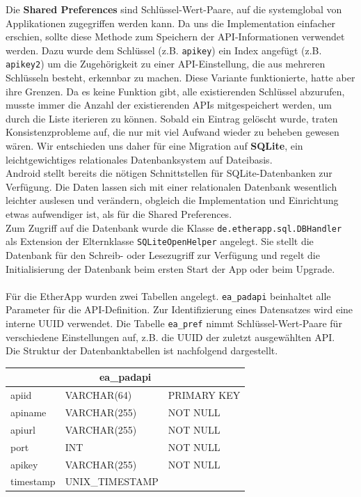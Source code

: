 Die \textbf{Shared Preferences} sind Schlüssel-Wert-Paare, auf die systemglobal von Applikationen zugegriffen werden kann.
Da uns die Implementation einfacher erschien, sollte diese Methode zum Speichern der API-Informationen verwendet werden.
Dazu wurde dem Schlüssel (z.B. \texttt{apikey}) ein Index angefügt (z.B. \texttt{apikey2}) um die Zugehörigkeit zu einer API-Einstellung, die aus mehreren Schlüsseln besteht, erkennbar zu machen.
Diese Variante funktionierte, hatte aber ihre Grenzen.
Da es keine Funktion gibt, alle existierenden Schlüssel abzurufen, musste immer die Anzahl der existierenden APIs mitgespeichert werden, um durch die Liste iterieren zu können.
Sobald ein Eintrag gelöscht wurde, traten Konsistenzprobleme auf, die nur mit viel Aufwand wieder zu beheben gewesen wären.
Wir entschieden uns daher für eine Migration auf \textbf{SQLite}, ein leichtgewichtiges relationales Datenbanksystem auf Dateibasis.\\
Android stellt bereits  die nötigen Schnittstellen für SQLite-Datenbanken zur Verfügung.
Die Daten lassen sich mit einer relationalen Datenbank wesentlich leichter auslesen und verändern, obgleich die Implementation und Einrichtung etwas aufwendiger ist, als für die Shared Preferences.\\
Zum Zugriff auf die Datenbank wurde die Klasse \texttt{de.etherapp.sql.DBHandler} als Extension der Elternklasse \texttt{SQLiteOpenHelper} angelegt.
Sie stellt die Datenbank für den Schreib- oder Lesezugriff zur Verfügung und regelt die Initialisierung der Datenbank beim ersten Start der App oder beim Upgrade.\\
\\
Für die EtherApp wurden zwei Tabellen angelegt.
\texttt{ea\_padapi} beinhaltet alle Parameter für die API-Definition.
Zur Identifizierung eines Datensatzes wird eine interne UUID verwendet.
Die Tabelle \texttt{ea\_pref} nimmt Schlüssel-Wert-Paare für verschiedene Einstellungen auf, z.B. die UUID der zuletzt ausgewählten API.\\
Die Struktur der Datenbanktabellen ist nachfolgend dargestellt.

\begin{table}[h!]
	\begin{center}
		\footnotesize
		\begin{tabular}{|p{2.5cm}|p{3.5cm}|p{3cm}|}
			\hline
			\multicolumn{3}{|c|}{\textbf{ea\_padapi}} \\ \hline
			\hline
			apiid 	& VARCHAR(64) 	& PRIMARY KEY \\ \hline
			apiname	& VARCHAR(255) 	& NOT NULL \\ \hline
			apiurl 	& VARCHAR(255) 	& NOT NULL \\ \hline
			port	& INT 			& NOT NULL \\ \hline
			apikey	& VARCHAR(255)	& NOT NULL \\ \hline
			timestamp & UNIX\_TIMESTAMP	&  \\ \hline
		\end{tabular}
	\end{center}
\end{table}

